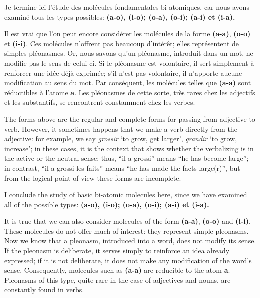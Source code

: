 \begin{sloppypar}
{     Je termine ici l’étude des molécules fondamentales bi-atomiques,
     car nous avons examiné tous les types possibles: \textbf{(a-o),
       (i-o); (o-a), (o-i); (a-i) et (i-a).}

     Il est vrai que l’on peut encore considérer les molécules de la
     forme \textbf{(a-a)}, \textbf{(o-o)} et \textbf{(i-i)}. Ces
     molécules n'offrent pas beaucoup d'intérêt; elles représentent de
     simples pléonasmes. Or, nous savons qu’un pléonasme, introduit
     dans un mot, ne modifie pas le sens de celui-ci. Si le pléonasme
     est volontaire, il sert simplement à renforcer une idée déjà
     exprimée; s’il n’est pas volontaire, il n'apporte aucune
     modification au sens du mot. Par conséquent, les molécules telles
     que \textbf{(a-a)} sont réductibles à l’atome \textbf{a}. Les
     pléonasmes de cette sorte, très rares chez les adjectifs et les
     substantifs, se rencontrent constamment chez les verbes.

   }
   {The forms above are the regular and complete forms for passing
     from adjective to verb. However, it sometimes happens that we
     make a verb directly from the adjective: for example, we say
     \emph{grossir} `to grow, get larger', \emph{grandir} `to grow,
     increase'; in these cases, it is the context that shows whether
     the verbalizing is in the active or the neutral sense: thus, ``il
     a grossi'' means ``he has become large''; in contrast, ``il a
     grossi les faits'' means ``he has made the facts large(r)'', but
     from the logical point of view these forms are incomplete.

     I conclude the study of basic bi-atomic molecules here, since we
     have examined all of the possible types: \textbf{(a-o), (i-o);
       (o-a), (o-i); (a-i) et (i-a).}

     It is true that we can also consider molecules of the form
     \textbf{(a-a)}, \textbf{(o-o)} and \textbf{(i-i)}. These
     molecules do not offer much of interest: they represent simple
     pleonasms. Now we know that a pleonasm, introduced into a word,
     does not modify its sense. If the pleonasm is deliberate, it
     serves simply to reinforce an idea already expressed; if it is
     not deliberate, it does not make any modification of the word's
     sense. Consequently, molecules such as \textbf{(a-a)} are
     reducible to the atom \textbf{a}. Pleonasms of this type, quite
     rare in the case of adjectives and nouns, are constantly found in
     verbs.
     
}
\end{sloppypar}
